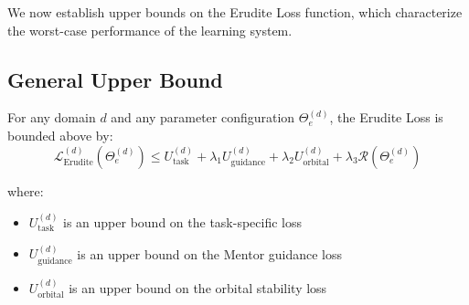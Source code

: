 We now establish upper bounds on the Erudite Loss function, which characterize the worst-case performance of the learning system.

\subsection{General Upper Bound}

\begin{theorem}
For any domain $d$ and any parameter configuration $\Theta_e^{(d)}$, the Erudite Loss is bounded above by:
\begin{equation}
\mathcal{L}_{\text{Erudite}}^{(d)}(\Theta_e^{(d)}) \leq U_{\text{task}}^{(d)} + \lambda_1 U_{\text{guidance}}^{(d)} + \lambda_2 U_{\text{orbital}}^{(d)} + \lambda_3 \mathcal{R}(\Theta_e^{(d)})
\end{equation}

where:
\begin{itemize}
    \item $U_{\text{task}}^{(d)}$ is an upper bound on the task-specific loss
    \item $U_{\text{guidance}}^{(d)}$ is an upper bound on the Mentor guidance loss
    \item $U_{\text{orbital}}^{(d)}$ is an upper bound on the orbital stability loss
\end{itemize}
\end{theorem}

